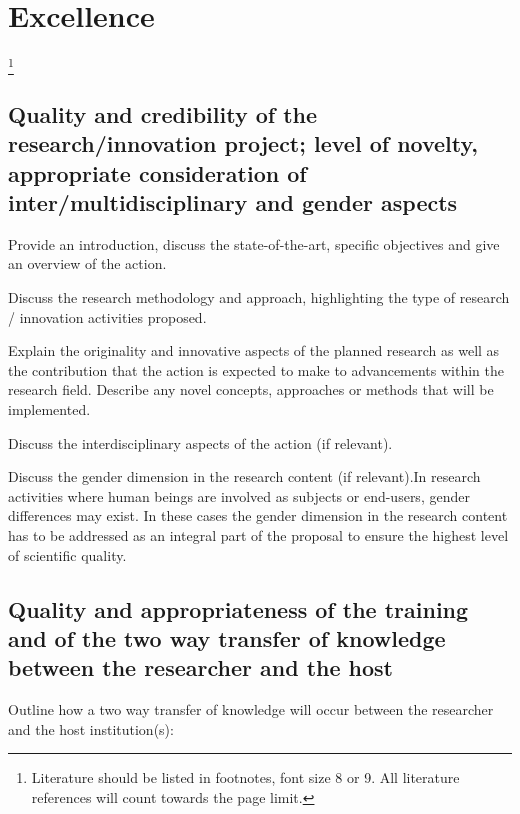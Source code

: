 
%

\markStartPageLimit

\section{Excellence}
\label{sec:excellence}\footnote{Literature should be listed in
footnotes, font size 8 or 9.  All literature references will count
towards the page limit.}

\subsection{Quality and credibility of the research/innovation
project; level of novelty, appropriate consideration of
inter/multidisciplinary and gender aspects}
\label{sec:excellence_quality}

Provide an introduction, discuss the state-of-the-art, specific
objectives and give an overview of the action.

Discuss the research methodology and approach, highlighting the
type of research / innovation activities proposed.

Explain the originality and innovative aspects of the planned
research as well as the contribution that the action is expected
to make to advancements within the research field. Describe any
novel concepts, approaches or methods that will be implemented.

Discuss the interdisciplinary aspects of the action (if relevant).

Discuss the gender dimension in the research content (if
relevant).In research activities where human beings are involved
as subjects or end-users, gender differences may exist. In these
cases the gender dimension in the research content has to be
addressed as an integral part of the proposal to ensure the
highest level of scientific quality.


\subsection{Quality and appropriateness of the training and of the
two way transfer of knowledge between the researcher and the host}
\label{sec:excellence_transfer}

\noindent Outline how a two way transfer of knowledge will occur
between the researcher and the host institution(s):

